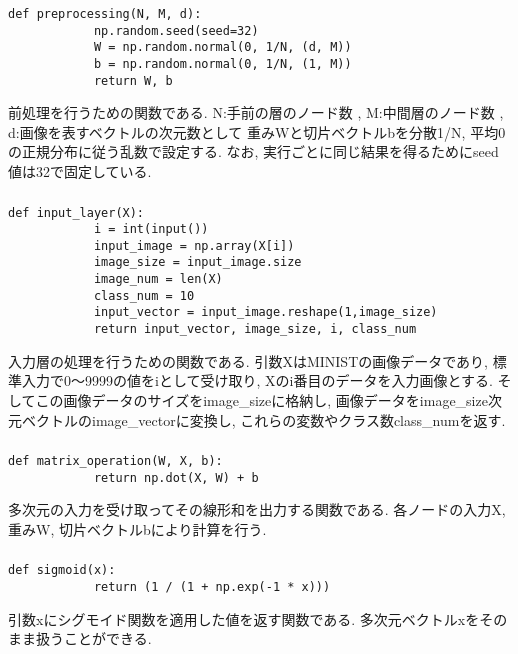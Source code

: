 \documentclass[a4j]{jarticle}
\begin{document}
    \subsubsection*{}
        \begin{lstlisting}[caption=前処理,label=fuga]
        def preprocessing(N, M, d):
            np.random.seed(seed=32)
            W = np.random.normal(0, 1/N, (d, M))
            b = np.random.normal(0, 1/N, (1, M))
            return W, b
        \end{lstlisting}
        前処理を行うための関数である.
        N:手前の層のノード数 , M:中間層のノード数 , d:画像を表すベクトルの次元数として
        重みWと切片ベクトルbを分散1/N, 平均0の正規分布に従う乱数で設定する.
        なお, 実行ごとに同じ結果を得るためにseed値は32で固定している.

    \subsubsection*{}
        \begin{lstlisting}[caption=入力層の処理,label=fuga]
        def input_layer(X):
            i = int(input())
            input_image = np.array(X[i])
            image_size = input_image.size
            image_num = len(X)
            class_num = 10
            input_vector = input_image.reshape(1,image_size)
            return input_vector, image_size, i, class_num
        \end{lstlisting}
        入力層の処理を行うための関数である.
        引数XはMINISTの画像データであり, 標準入力で0～9999の値をiとして受け取り,
        Xのi番目のデータを入力画像とする.
        そしてこの画像データのサイズをimage\_sizeに格納し, 画像データをimage\_size次元ベクトルのimage\_vectorに変換し, これらの変数やクラス数class\_numを返す.

    \subsubsection*{}
        \begin{lstlisting}[caption=線形和の計算,label=fuga]
        def matrix_operation(W, X, b):
            return np.dot(X, W) + b
        \end{lstlisting}
        多次元の入力を受け取ってその線形和を出力する関数である.
        各ノードの入力X, 重みW, 切片ベクトルbにより計算を行う.

    \subsubsection*{}
        \begin{lstlisting}[caption=シグモイド関数,label=fuga]
        def sigmoid(x):
            return (1 / (1 + np.exp(-1 * x)))
        \end{lstlisting}
        引数xにシグモイド関数を適用した値を返す関数である.
        多次元ベクトルxをそのまま扱うことができる.
\end{document}
